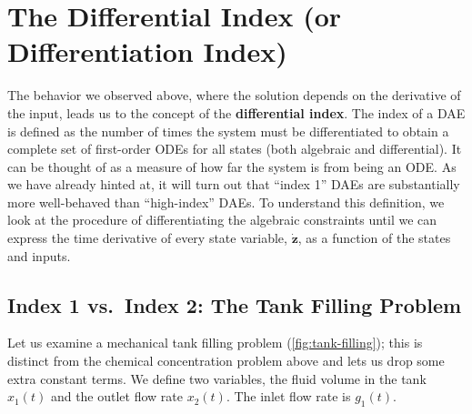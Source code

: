 \section{The Differential Index (or Differentiation Index)}

The behavior we observed above, where the solution depends on the derivative of the input, leads us to the concept of the \textbf{differential index}. The index of a DAE is defined as the number of times the system must be differentiated to obtain a complete set of first-order ODEs for all states (both algebraic and differential). It can be thought of as a measure of how far the system is from being an ODE. As we have already hinted at, it will turn out that ``index 1'' DAEs are substantially more well-behaved than ``high-index'' DAEs. To understand this definition, we look at the procedure of differentiating the algebraic constraints until we can express the time derivative of every state variable, $\dot{\mathbf{z}}$, as a function of the states and inputs.

\subsection{Index 1 vs.\ Index 2: The Tank Filling Problem}

Let us examine a mechanical tank filling problem (\autoref{fig:tank-filling}); this is distinct from the chemical concentration problem above and lets us drop some extra constant terms. We define two variables, the fluid volume in the tank $x_1(t)$ and the outlet flow rate $x_2(t)$. The inlet flow rate is $g_1(t)$.

